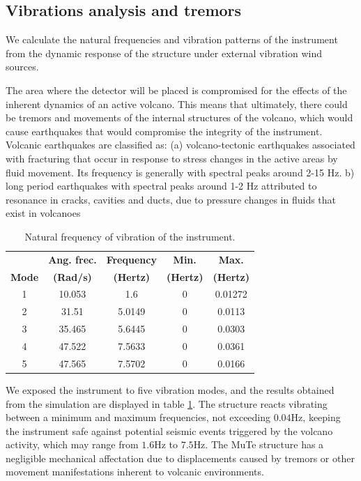 \documentclass[letterpaper,11pt]{article}
\begin{document}
\subsection{Vibrations analysis and tremors}
We calculate the natural frequencies and vibration patterns of the instrument from the dynamic response of the structure under external vibration wind sources. 

The area where the detector will be placed is compromised for the effects of the inherent dynamics of an active volcano. This means that ultimately, there could be tremors and movements of the internal structures of the volcano, which would cause earthquakes that would compromise the integrity of the instrument. Volcanic earthquakes are classified as: (a) volcano-tectonic earthquakes associated with fracturing that occur in response to stress changes in the active areas by fluid movement. Its frequency is generally with spectral peaks around 2-15 Hz. b) long period earthquakes with spectral peaks around 1-2 Hz attributed to resonance in cracks, cavities and ducts, due to pressure changes in fluids that exist in volcanoes \cite{mcnutt1992volcanic,londono2001spectral,langer2006automatic,chouet2003volcano}

\begin{table}[htb]
\begin{center}
\begin{tabular}{ccccc}
\hline
& {\bf Ang. frec.} & {\bf Frequency} & {\bf Min.}  & {\bf Max.}\\
{\bf Mode} & {\bf (Rad/s)} & {\bf (Hertz)} & {\bf (Hertz)} & {\bf (Hertz)} \\
\hline
1 & 10.053 & 1.6 & 0 & 0.01272\\ 
2 & 31.51 & 5.0149  & 0 & 0.0113 \\
3 & 35.465 & 5.6445  & 0 & 0.0303 \\
4 & 47.522 & 7.5633  & 0 & 0.0361 \\
5 & 47.565 & 7.5702 & 0 & 0.0166 \\
\hline
\end{tabular}
\end{center}
\caption{Natural frequency of vibration of the instrument.}
\label{Table_nat_frec1}
\end{table}

We exposed the instrument to five vibration modes, and the results obtained from the simulation are displayed in table \ref{Table_nat_frec1}. The structure reacts vibrating between a minimum and maximum frequencies, not exceeding $0.04$Hz, keeping the instrument safe against potential seismic events triggered by the volcano activity, which may range from $1.6$Hz to $7.5$Hz. The MuTe structure has a negligible mechanical affectation due to displacements caused by tremors or other movement manifestations inherent to volcanic environments.
\end{document}
